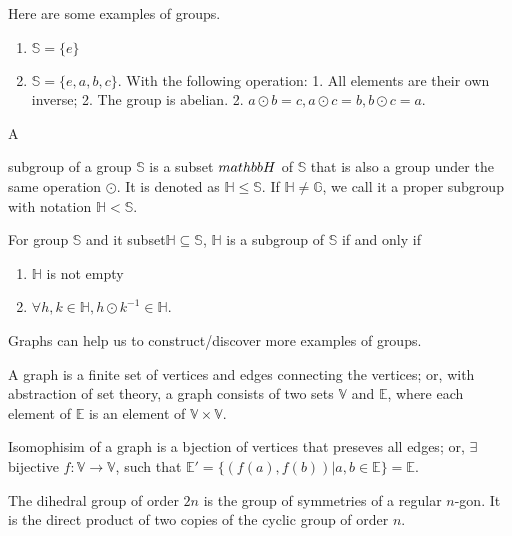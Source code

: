 \documentclass[../note.tex]{subfiles}
\begin{document}
Here are some examples of groups. 
\begin{enumerate}
	\item $\mathbb{S}=\{e\}$
	\item $\mathbb{S} = \{e, a, b, c\}.$ With the following operation:
		1. All elements are their own inverse; 
		2. The group is abelian.
		2. $a \odot b = c, a \odot c = b, b \odot c = a$.
\end{enumerate}

\begin{definition}[Subgroup]
	\hypertarget{def:subgroup}{A} subgroup of a group $\mathbb{S}$ is a subset $\\mathbb{H}$ of $\mathbb{S}$ that is also a group under the same operation $\odot$. It is denoted as $ \mathbb{H}\leq \mathbb{S}$. If $\mathbb{H} \neq \mathbb{G}$, we call it a proper subgroup with notation $\mathbb{H}< \mathbb{S}$.
\end{definition}

\begin{theorem} 
	For group $\mathbb{S}$ and it subset$\mathbb{H} \subseteq \mathbb{S}$, $\mathbb{H}$ is a subgroup of $\mathbb{S}$ if and only if 
	\begin{enumerate}
		\item $\mathbb{H}$ is not empty 
		\item $\forall h,k \in \mathbb{H}, h\odot k^{-1} \in \mathbb{H}$.
	\end{enumerate}
\end{theorem}

Graphs can help us to construct/discover more examples of groups.

\begin{definition}[Graph]
	A graph is a finite set of vertices and edges connecting the vertices;
	or, with abstraction of set theory, a graph consists of two sets $\mathbb{V}$ and $\mathbb{E}$, where each element of $\mathbb{E}$ is an element of $\mathbb{V}\times \mathbb{V}.$
\end{definition}

\begin{definition}[Isomophisim]
	Isomophisim of a graph is a bjection of vertices that preseves all edges;
	or, $\exists$ bijective $ f:\mathbb{V}\to \mathbb{V}$, such that $\mathbb{E}'= \{(f(a),f(b))|a,b \in \mathbb{E}\}=\mathbb{E}$.
\end{definition}

\begin{definition}
	The dihedral group of order $2n$ is the group of symmetries of a regular $n$-gon. It is the direct product of two copies of the cyclic group of order $n$.
\end{definition}
\end{document}
